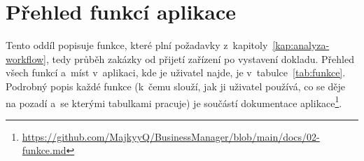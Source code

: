 \section{Přehled funkcí aplikace}\label{sec:funkce-aplikace}

Tento oddíl popisuje funkce, které plní požadavky z~kapitoly~\ref{kap:analyza-workflow}, tedy průběh zakázky od přijetí zařízení po vystavení dokladu. Přehled všech funkcí a~míst v~aplikaci, kde je uživatel najde, je v~tabulce~\ref{tab:funkce}. Podrobný popis každé funkce (k~čemu slouží, jak ji uživatel používá, co se děje na pozadí a~se kterými tabulkami pracuje) je součástí dokumentace aplikace\footnote{\url{https://github.com/MajkyyQ/BusinessManager/blob/main/docs/02-funkce.md}}.

